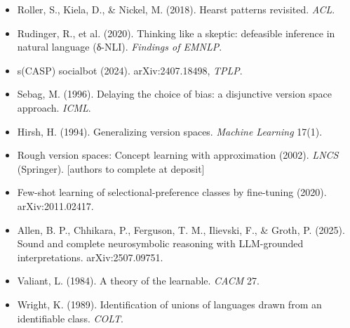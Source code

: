 \documentclass[11pt]{article}
\begin{document}
\begin{itemize}
\item Roller, S., Kiela, D., \& Nickel, M. (2018). Hearst patterns revisited. \emph{ACL}.
\item Rudinger, R., et al. (2020). Thinking like a skeptic: defeasible inference in natural language (δ-NLI). \emph{Findings of EMNLP}.
\item s(CASP) socialbot (2024). arXiv:2407.18498, \emph{TPLP}.
\item Sebag, M. (1996). Delaying the choice of bias: a disjunctive version space approach. \emph{ICML}.
\item Hirsh, H. (1994). Generalizing version spaces. \emph{Machine Learning} 17(1).
\item Rough version spaces: Concept learning with approximation (2002). \emph{LNCS} (Springer). [authors to complete at deposit]
\item Few-shot learning of selectional-preference classes by fine-tuning (2020). arXiv:2011.02417.
\item Allen, B. P., Chhikara, P., Ferguson, T. M., Ilievski, F., \& Groth, P. (2025). Sound and complete neurosymbolic reasoning with LLM-grounded interpretations. arXiv:2507.09751.
\item Valiant, L. (1984). A theory of the learnable. \emph{CACM} 27.
\item Wright, K. (1989). Identification of unions of languages drawn from an identifiable class. \emph{COLT}.

\end{itemize}
\end{document}
